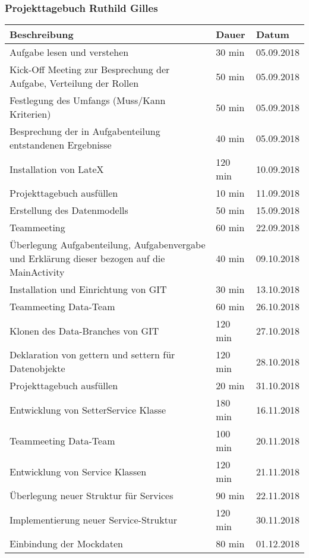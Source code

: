 \subsubsection{Projekttagebuch Ruthild Gilles}
\begin{longtable}{|p{10cm}|p{2cm}|p{2cm}|}
\hline
{\textbf{Beschreibung}} & {\textbf{Dauer}} & {\textbf{Datum}} \\ \hline
Aufgabe lesen und verstehen & 30 min & 05.09.2018 \\ \hline
Kick-Off Meeting zur Besprechung der Aufgabe, Verteilung der Rollen & 50 min & 05.09.2018 \\ \hline
Festlegung des Umfangs (Muss/Kann Kriterien) & 50 min & 05.09.2018 \\ \hline
Besprechung der in Aufgabenteilung entstandenen Ergebnisse & 40 min & 05.09.2018 \\ \hline
Installation von LateX & 120 min & 10.09.2018 \\ \hline
Projekttagebuch ausfüllen & 10 min & 11.09.2018 \\ \hline
Erstellung des Datenmodells & 50 min & 15.09.2018 \\ \hline
Teammeeting & 60 min & 22.09.2018 \\ \hline
Überlegung Aufgabenteilung, Aufgabenvergabe und Erklärung dieser bezogen auf die MainActivity & 40 min & 09.10.2018 \\ \hline
Installation und Einrichtung von GIT & 30 min & 13.10.2018 \\ \hline
Teammeeting Data-Team &  60 min & 26.10.2018 \\ \hline
Klonen des Data-Branches von GIT & 120 min & 27.10.2018 \\ \hline
Deklaration von gettern und settern für Datenobjekte & 120 min & 28.10.2018 \\ \hline
Projekttagebuch ausfüllen & 20 min & 31.10.2018 \\ \hline
Entwicklung von SetterService Klasse & 180 min & 16.11.2018 \\ \hline
Teammeeting Data-Team & 100 min & 20.11.2018 \\ \hline
Entwicklung von Service Klassen & 120 min & 21.11.2018 \\ \hline
Überlegung neuer Struktur für Services & 90 min & 22.11.2018 \\ \hline
Implementierung neuer Service-Struktur & 120 min & 30.11.2018 \\ \hline
Einbindung der Mockdaten & 80 min & 01.12.2018 \\ \hline

\end{longtable}
